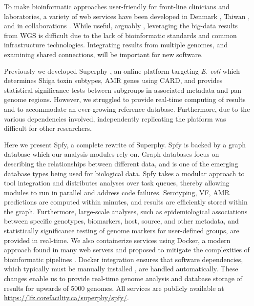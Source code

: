 \documentclass[a4,center,fleqn]{NAR}
\begin{document}
To make bioinformatic approaches user-friendly for front-line clinicians and laboratories, a variety of web services have been developed in Denmark \cite{joensen2014real,larsen2012multilocus}, Taiwan \cite{liu2016construction}, and in collaborations \cite{hasman2015detection}.
While useful, arguably \cite{fricke2014bacterial}, leveraging the big-data results from WGS is difficult due to the lack of bioinformatic standards and common infrastructure technologies.
Integrating results from multiple genomes, and examining shared connections, will be important for new software.

Previously we developed Superphy \cite{whiteside2016superphy}, an online platform targeting \textit{E. coli} which determines Shiga toxin subtypes, AMR genes using CARD, and provides statistical significance tests between subgroups in associated metadata and pan-genome regions.
However, we struggled to provide real-time computing of results and to accommodate an ever-growing reference database.
Furthermore, due to the various dependencies involved, independently replicating the platform was difficult for other researchers.

Here we present Spfy, a complete rewrite of Superphy.
Spfy is backed by a graph database which our analysis modules rely on.
Graph databases focus on describing the relationships between different data, and is one of the emerging \cite{de2015trends} database types being used for biological data.
Spfy takes a modular approach to tool integration and distributes analyses over task queues, thereby allowing modules to run in parallel and address code failures.
Serotyping, VF, AMR predictions are computed within minutes, and results are efficiently stored within the graph.
Furthermore, large-scale analyses, such as epidemiological associations between specific genotypes, biomarkers, host, source, and other metadata, and statistically significance testing of genome markers for user-defined groups, are provided in real-time.
We also containerize services using Docker, a modern approach found in many web servers and proposed to mitigate the complexities of bioinformatic pipelines \cite{di2015impact}.
Docker integration ensures that software dependencies, which typically must be manually installed \cite{doi:10.1093/bioinformatics/btu153,laing2010pan,inouye2014srst2}, are handled automatically.
These changes enable us to provide real-time genome analysis and database storage of results for upwards of 5000 genomes.
All services are publicly available at \url{https://lfz.corefacility.ca/superphy/spfy/}.
\end{document}
